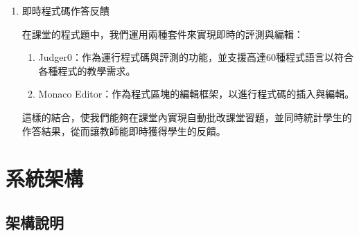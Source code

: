 \documentclass[12pt]{article}
\begin{document}
\begin{enumerate}[label=(\arabic*)]
  \item 即時程式碼作答反饋
  \par 在課堂的程式題中，我們運用兩種套件來實現即時的評測與編輯：
  \begin{enumerate}[label=(\arabic*)]
    \setlength{\parindent}{2em}
    \item Judger0：作為運行程式碼與評測的功能，並支援高達60種程式語言以符合各種程式的教學需求。
    \item Monaco Editor：作為程式區塊的編輯框架，以進行程式碼的插入與編輯。
  \end{enumerate}
  \par 這樣的結合，使我們能夠在課堂內實現自動批改課堂習題，並同時統計學生的作答結果，從而讓教師能即時獲得學生的反饋。
\end{enumerate}
\section{系統架構}

\subsection{架構說明}
\end{document}
